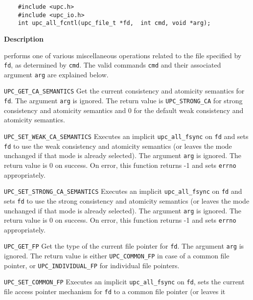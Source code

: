 \npf\vspace{-2.5em}
\begin{verbatim}
    #include <upc.h>
    #include <upc_io.h>
    int upc_all_fcntl(upc_file_t *fd,  int cmd, void *arg);
\end{verbatim}

{\bf Description}

 performs one of various miscellaneous operations related
to the file specified by {\tt fd}, as determined by {\tt cmd}. The valid commands {\tt cmd}
and their associated argument {\tt arg} are explained below.

\begin{description}
\item{\tt UPC\_GET\_CA\_SEMANTICS}
Get the current consistency and atomicity semantics for {\tt fd}. The 
argument {\tt arg} is ignored.
The return value is {\tt UPC\_STRONG\_CA} for strong consistency and atomicity 
semantics and 0 for the default weak consistency and atomicity semantics.
\item{\tt UPC\_SET\_WEAK\_CA\_SEMANTICS}
Executes an implicit {\tt upc\_all\_fsync} on {\tt fd} and sets {\tt fd} to use the weak 
consistency and atomicity semantics (or leaves the mode unchanged if that mode is already selected).
The argument {\tt arg} is ignored.
The return value is 0 on success. On error, this function returns 
-1 and sets {\tt errno} appropriately.
\item{\tt UPC\_SET\_STRONG\_CA\_SEMANTICS}
Executes an implicit {\tt upc\_all\_fsync} on {\tt fd} and sets {\tt fd} to use the strong 
consistency and atomicity semantics (or leaves the mode unchanged if that mode is already selected).
The argument {\tt arg} is ignored.
The return value is 0 on success. On error, this function returns 
-1 and sets {\tt errno} appropriately.
\item{\tt UPC\_GET\_FP}
Get the type of the current file pointer for {\tt fd}.
The argument {\tt arg} is ignored.
The return value is either {\tt UPC\_COMMON\_FP} in case of a common 
file pointer, or {\tt UPC\_INDIVIDUAL\_FP} for individual file pointers.
\item{\tt UPC\_SET\_COMMON\_FP}
Executes an implicit {\tt upc\_all\_fsync} on {\tt fd}, sets the current file
access pointer mechanism for {\tt fd} to a common file pointer (or leaves it

\end{description}
